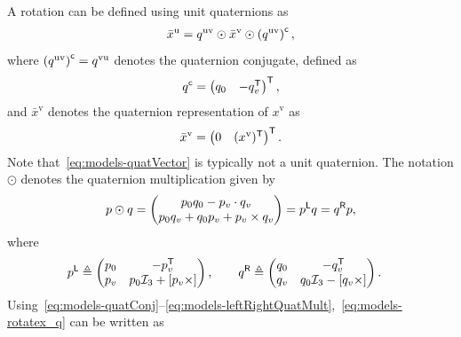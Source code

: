 A rotation can be defined using unit quaternions as
\begin{align}
  \label{eq:models-rotatex_q}
  \bar x^\text{u} = 
    q^\text{uv} \odot \bar x^\text{v} \odot \left( q^\text{uv} \right)^{\mathsf{c}},
\end{align}
where $\left( q^\text{uv} \right)^{\mathsf{c}} = q^\text{vu}$ denotes the quaternion conjugate, defined as
\begin{align}
\label{eq:models-quatConj}
q^{\mathsf{c}} = \begin{pmatrix} q_0 & -q_v^{\mathsf{T}} \end{pmatrix}^{\mathsf{T}},
\end{align}
and $\bar x^\text{v}$ denotes the quaternion representation of $x^\text{v}$ as 
\begin{align}
\label{eq:models-quatVector}
\bar x^\text{v} = \begin{pmatrix} 0 & (x^\text{v})^{\mathsf{T}} \end{pmatrix}^{\mathsf{T}}.
\end{align}
Note that~\eqref{eq:models-quatVector} is typically not a unit quaternion. The notation $\odot$ denotes the quaternion multiplication given by 
\begin{align}
\label{eq:models-quatMult}
p \odot q = \begin{pmatrix} p_0 q_0 - p_v \cdot q_v \\ p_0 q_v + q_0 p_v + p_v \times q_v \end{pmatrix} = p^{\mathsf{L}} q = q^{\mathsf{R}} p,
\end{align}
where 
\begin{align}
\label{eq:models-leftRightQuatMult}
p^{\mathsf{L}} &\triangleq \begin{pmatrix} p_0 & -p_v^{\mathsf{T}} \\ p_v & p_0 \mathcal{I}_3 + [p_v \times] \end{pmatrix}, \qquad q^{\mathsf{R}} \triangleq \begin{pmatrix} q_0 & -q_v^{\mathsf{T}} \\ q_v & q_0 \mathcal{I}_3 - [q_v \times] \end{pmatrix}.
\end{align}
Using~\eqref{eq:models-quatConj}--\eqref{eq:models-leftRightQuatMult},~\eqref{eq:models-rotatex_q} can be written as

